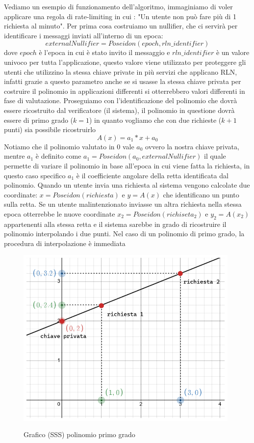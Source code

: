 Vediamo un esempio di funzionamento dell'algoritmo, immaginiamo di voler applicare una regola di rate-limiting in cui :
"Un utente non può fare più di 1 richiesta al minuto". Per prima cosa costruiamo un nullifier, che ci servirà per
identificare i messaggi inviati all'interno di un epoca:
$$externalNullifier = Poseidon(epoch,rln\_identifier)$$ dove $epoch$ è l'epoca in cui è stato invito il messaggio e
$rln\_identifier$ è un valore univoco per tutta l'applicazione, questo valore viene utilizzato per proteggere gli utenti
che utilizzino la stessa chiave private in più servizi che applicano RLN, infatti grazie a questo parametro anche se si
usasse la stessa chiave privata per costruire il polinomio in applicazioni differenti si otterrebbero valori differenti in fase di valutazione.
Proseguiamo con l'identificazione del polinomio che dovrà essere ricostruito dal verificatore (il sistema), il polinomio
in questione dovrà essere di primo grado ($k=1$) in quanto vogliamo che con due richieste ($k+1$ punti) sia possibile
ricostruirlo
$$ A(x) = a_1 * x + a_0$$ Notiamo che il polinomio valutato in 0 vale $a_0$ ovvero la nostra chiave privata, mentre
$a_1$ è definito come $a_1 = Poseidon(a_0, externalNullifier)$ il quale permette di variare il polinomio in base all'epoca in
cui viene fatta la richiesta, in questo caso specifico $a_1$ è il coefficiente angolare della retta identificata dal
polinomio. Quando un utente invia una richiesta al sistema vengono calcolate due coordinate: $x = Poseidon(richiesta)$ e
$y=A(x)$ che identificano un punto sulla retta. Se un utente malintenzionato inviasse un altra richiesta nella stessa epoca
otterrebbe le nuove coordinate $x_2 = Poseidon(richiseta_2)$ e $y_2=A(x_2)$ appartenenti alla stessa retta e il sistema
sarebbe in grado di ricostruire il polinomio interpolando i due punti. Nel caso di un polinomio di primo grado, la
procedura di interpolazione è immediata
\begin{figure}[H]
    \centering
    \includegraphics[width=11cm]{./chapters/2.rln-protocol/images/6.a_0_interpolation.png}
    \label{fig:a_0_interpolation}
    \captionsetup{justification=centering}
    \caption{Grafico (SSS) polinomio primo grado}
\end{figure}